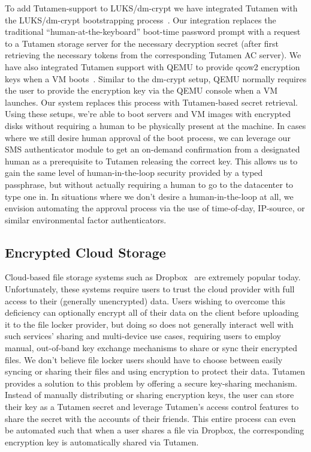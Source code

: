 To add Tutamen-support to LUKS/dm-crypt we have integrated Tutamen
with the LUKS/dm-crypt bootstrapping
process~\cite{src-tutamen-askpassword}. Our integration replaces the
traditional ``human-at-the-keyboard'' boot-time password prompt with a
request to a Tutamen storage server for the necessary decryption
secret (after first retrieving the necessary tokens from the
corresponding Tutamen AC server). We have also integrated Tutamen
support with QEMU to provide qcow2 encryption keys when a VM
boots~\cite{src-qemu-tutamen}. Similar to the dm-crypt setup, QEMU
normally requires the user to provide the encryption key via the QEMU
console when a VM launches. Our system replaces this process with
Tutamen-based secret retrieval. Using these setups, we're able to boot
servers and VM images with encrypted disks without requiring a human
to be physically present at the machine. In cases where we still
desire human approval of the boot process, we can leverage our SMS
authenticator module to get an on-demand confirmation from a
designated human as a prerequisite to Tutamen releasing the correct
key. This allows us to gain the same level of human-in-the-loop
security provided by a typed passphrase, but without actually
requiring a human to go to the datacenter to type one in. In
situations where we don't desire a human-in-the-loop at all, we
envision automating the approval process via the use of time-of-day,
IP-source, or similar environmental factor authenticators.

\subsection{Encrypted Cloud Storage}

Cloud-based file storage systems such as Dropbox~\cite{dropbox} are
extremely popular today. Unfortunately, these systems require users to
trust the cloud provider with full access to their (generally
unencrypted) data. Users wishing to overcome this deficiency can
optionally encrypt all of their data on the client before uploading it
to the file locker provider, but doing so does not generally interact
well with such services' sharing and multi-device use cases, requiring
users to employ manual, out-of-band key exchange mechanisms to share
or sync their encrypted files. We don't believe file locker users
should have to choose between easily syncing or sharing their files
and using encryption to protect their data. Tutamen provides a
solution to this problem by offering a secure key-sharing
mechanism. Instead of manually distributing or sharing encryption
keys, the user can store their key as a Tutamen secret and leverage
Tutamen's access control features to share the secret with the
accounts of their friends. This entire process can even be automated
such that when a user shares a file via Dropbox, the corresponding
encryption key is automatically shared via Tutamen.

